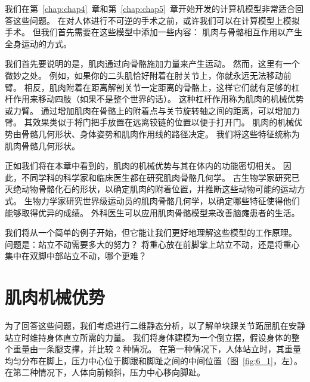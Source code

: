 我们在第~\ref{chap:chap4}~章和第~\ref{chap:chap5}~章开始开发的计算机模型非常适合回答这些问题。
在对人体进行不可逆的手术之前，或许我们可以在计算模型上模拟手术。
但我们首先需要在这些模型中添加一些内容：
肌肉与骨骼相互作用以产生全身运动的方式。


我们首先要说明的是，肌肉通过向骨骼施加力量来产生运动。
然而，这里有一个微妙之处。
例如，如果你的二头肌恰好附着在肘关节上，你就永远无法移动前臂。
相反，肌肉附着在距离解剖关节一定距离的骨骼上，这样它们就有足够的杠杆作用来移动四肢（如果不是整个世界的话）。
这种杠杆作用称为肌肉的机械优势或力臂。
通过增加肌肉在骨骼上的附着点与关节旋转轴之间的距离，可以增加力臂。
其效果类似于将门把手放置在远离铰链的位置以便于打开门。
肌肉的机械优势由骨骼几何形状、身体姿势和肌肉作用线的路径决定。
我们将这些特征统称为肌肉骨骼几何形状。


正如我们将在本章中看到的，肌肉的机械优势与其在体内的功能密切相关。
因此，不同学科的科学家和临床医生都在研究肌肉骨骼几何学。
古生物学家研究已灭绝动物骨骼化石的形状，以确定肌肉的附着位置，并推断这些动物可能的运动方式。
生物力学家研究世界级运动员的肌肉骨骼几何学，以确定哪些特征使得他们能够取得优异的成绩。
外科医生可以应用肌肉骨骼模型来改善脑瘫患者的生活。


我们将从一个简单的例子开始，但它能让我们更好地理解这些模型的工作原理。
问题是：站立不动需要多大的努力？
将重心放在前脚掌上站立不动，还是将重心集中在双脚中部站立不动，哪个更难？



\section{肌肉机械优势}

为了回答这些问题，我们考虑进行二维静态分析，以了解单块踝关节跖屈肌在安静站立时维持身体直立所需的力量。
我们将身体建模为一个倒立摆，假设身体的整个重量由一条腿支撑，并比较 2 种情况。
在第一种情况下，人体站立时，其重量均匀分布在脚上，压力中心位于脚跟和脚趾之间的中间位置（图~\ref{fig:6_1}，左）。
在第二种情况下，人体向前倾斜，压力中心移向脚趾。


